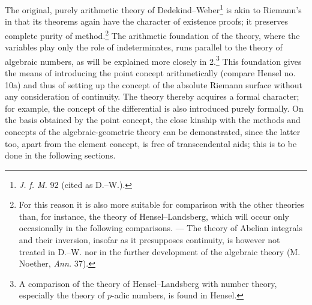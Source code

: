\documentclass[11pt]{article}
\begin{document}
The original, purely arithmetic theory of Dedekind--Weber\footnote{\emph{J. f. M.} 92 (cited as D.--W.).} is akin to Riemann's in that its theorems again have the character of existence proofs; it preserves complete purity of method.\footnote{For this reason it is also more suitable for comparison with the other theories than, for instance, the theory of Hensel--Landsberg, which will occur only occasionally in the following comparisons. --- The theory of Abelian integrals and their inversion, insofar as it presupposes continuity, is however not treated in D.--W. nor in the further development of the algebraic theory (M. Noether, \emph{Ann.} 37).} The arithmetic foundation of the theory, where the variables play only the role of indeterminates, runs parallel to the theory of algebraic numbers, as will be explained more closely in 2.\footnote{A comparison of the theory of Hensel--Landsberg with number theory, especially the theory of \(p\)-adic numbers, is found in Hensel.} This foundation gives the means of introducing the point concept arithmetically (compare Hensel no. 10a) and thus of setting up the concept of the absolute Riemann surface without any consideration of continuity. The theory thereby acquires a formal character; for example, the concept of the differential is also introduced purely formally. On the basis obtained by the point concept, the close kinship with the methods and concepts of the algebraic-geometric theory can be demonstrated, since the latter too, apart from the element concept, is free of transcendental aids; this is to be done in the following sections.
\end{document}
